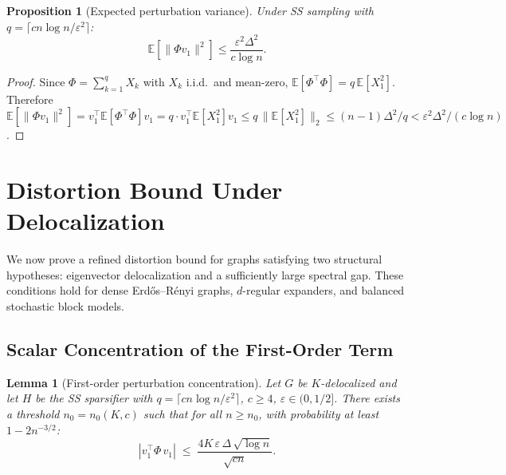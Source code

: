 \documentclass[11pt]{article}
\newtheorem{lemma}[theorem]{Lemma}
\newtheorem{proposition}[theorem]{Proposition}
\theoremstyle{definition}
\newcommand{\eps}{\varepsilon}
\newcommand{\vone}{v_1}
\newcommand{\E}{\mathbb{E}}
\begin{document}
\begin{proposition}[Expected perturbation variance]\label{prop:variance}
Under SS sampling with $q = \lceil cn\log n/\eps^2 \rceil$:
\[
\E\!\left[\|\Phi\vone\|^2\right] \leq \frac{\eps^2\Delta^2}{c\log n}.
\]
\end{proposition}
\begin{proof}
Since $\Phi = \sum_{k=1}^q X_k$ with $X_k$ i.i.d.\ and mean-zero,
$\E[\Phi^\top \Phi] = q\,\E[X_1^2]$. Therefore
$\E[\|\Phi\vone\|^2] = \vone^\top \E[\Phi^\top \Phi]\vone
= q \cdot \vone^\top \E[X_1^2]\vone
\leq q\,\|\E[X_1^2]\|_2 \leq (n-1)\Delta^2/q
< \eps^2\Delta^2/(c\log n)$.
\end{proof}


\section{Distortion Bound Under Delocalization}\label{sec:delocalized}

We now prove a refined distortion bound
for graphs satisfying two structural hypotheses: eigenvector delocalization and a
sufficiently large spectral gap. These conditions hold for dense Erd\H{o}s--R\'{e}nyi
graphs, $d$-regular expanders, and balanced stochastic block models.

\subsection{Scalar Concentration of the First-Order Term}

\begin{lemma}[First-order perturbation concentration]\label{lem:first-order}
Let $G$ be $K$-delocalized and let $H$ be the SS sparsifier with
$q = \lceil cn\log n/\eps^2 \rceil$, $c \geq 4$, $\eps \in (0, 1/2]$.
There exists a threshold $n_0 = n_0(K, c)$ such that for all $n \geq n_0$,
with probability at least $1 - 2n^{-3/2}$:
\[
|\vone^\top \Phi\,\vone|
\;\leq\; \frac{4K\,\eps\,\Delta\,\sqrt{\log n}}{\sqrt{cn}}.
\]
\end{lemma}
\end{document}
